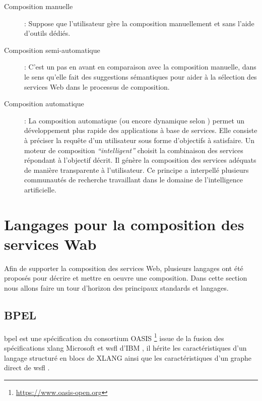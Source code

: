     \renewcommand{\descriptionlabel}[1]{\hspace{0.5cm}\textbullet~\textsf{#1}}
    \begin{description}
    \item[Composition manuelle]: Suppose que l'utilisateur gère la
      composition manuellement et sans l'aide d'outils dédiés.\medskip

    \item[Composition semi-automatique]: C'est un pas en avant en
      comparaison avec la composition manuelle, dans le sens qu'elle
      fait des suggestions sémantiques pour aider à la sélection des
      services Web dans le processus de composition.\medskip

    \item[Composition automatique]: La composition automatique (ou
      encore dynamique selon \cite{fluegge2006challenges}) permet un
      développement plus rapide des applications à base de
      services. Elle consiste à préciser la requête d'un utilisateur
      sous forme d'objectifs à satisfaire. Un moteur de composition
      \textit{``intelligent''} choisit la combinaison des services
      répondant à l'objectif décrit. Il génère la composition des
      services adéquats de manière transparente à l'utilisateur. Ce
      principe a interpellé plusieurs communautés de recherche
      travaillant dans le domaine de l'intelligence artificielle.
      \cite{elie2010}
    \end{description}
    \enddescription

\section{Langages pour la composition des services Wab}
\label{sec:lang-de-comp}
Afin de supporter la composition des services Web, plusieurs langages
ont été proposés pour décrire et mettre en oeuvre une composition.
Dans cette section nous allons faire un tour d'horizon des principaux
standards et langages.

  \subsection{BPEL}
  \label{sec:bpel}
  \acrshort{bpel} est une spécification du consortium OASIS
  \footnote{\url{https://www.oasis-open.org}} issue de la fusion des
  spécifications \acrshort{xlang} Microsoft et \acrshort{wsfl} d'IBM ,
  il hérite les caractéristiques d'un langage structuré en blocs de
  \textsc{XLANG} ainsi que les caractéristiques d'un graphe direct de
  \acrshort{wsfl} \cite{driss2011approche}.\medskip

